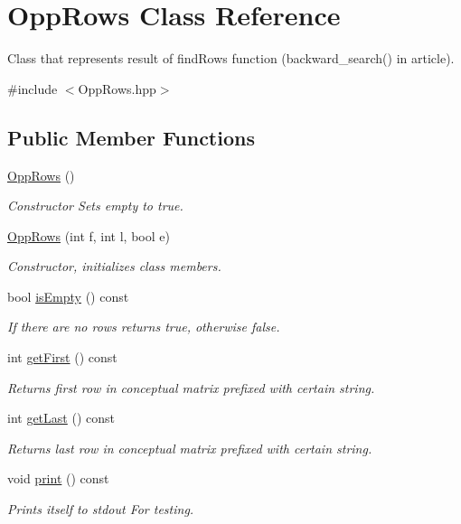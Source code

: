 \hypertarget{class_opp_rows}{\section{\-Opp\-Rows \-Class \-Reference}
\label{class_opp_rows}
}


\-Class that represents result of find\-Rows function (backward\-\_\-search() in article).  




{\ttfamily \#include $<$\-Opp\-Rows.\-hpp$>$}

\subsection*{\-Public \-Member \-Functions}
\begin{DoxyCompactItemize}
\item 
\hyperlink{class_opp_rows_ac2d26311b6adfc0bed56b42ae9edb40a}{\-Opp\-Rows} ()
\begin{DoxyCompactList}\small\item\em \-Constructor \-Sets empty to true. \end{DoxyCompactList}\item 
\hyperlink{class_opp_rows_a6431d64057b92bb701976adaf09562fd}{\-Opp\-Rows} (int f, int l, bool e)
\begin{DoxyCompactList}\small\item\em \-Constructor, initializes class members. \end{DoxyCompactList}\item 
bool \hyperlink{class_opp_rows_a9f11044d21c4f7a312c4138ff8580091}{is\-Empty} () const 
\begin{DoxyCompactList}\small\item\em \-If there are no rows returns true, otherwise false. \end{DoxyCompactList}\item 
int \hyperlink{class_opp_rows_acc406979763d038ce012be3be3033dd6}{get\-First} () const 
\begin{DoxyCompactList}\small\item\em \-Returns first row in conceptual matrix prefixed with certain string. \end{DoxyCompactList}\item 
int \hyperlink{class_opp_rows_a5d349c5a357038bdea7532d95f51772c}{get\-Last} () const 
\begin{DoxyCompactList}\small\item\em \-Returns last row in conceptual matrix prefixed with certain string. \end{DoxyCompactList}\item 
void \hyperlink{class_opp_rows_a86b476d581122486b550330d63acfdb6}{print} () const 
\begin{DoxyCompactList}\small\item\em \-Prints itself to stdout \-For testing. \end{DoxyCompactList}\end{DoxyCompactItemize}



